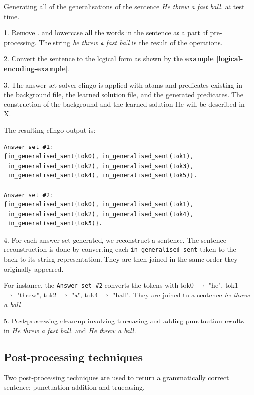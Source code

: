 \begin{example}
Generating all of the generalisations of the sentence \emph{He threw a fast ball.} at test time.

1. Remove . and lowercase all the words in the sentence as a part of pre-processing. The string \emph{he threw a fast ball} is the result of the operations.

2. Convert the sentence to the logical form as shown by the \textbf{example \ref{logical-encoding-example}}.

3. The answer set solver clingo is applied with atoms and predicates existing in the background file, the learned solution file, and the generated predicates.
The construction of the background and the learned solution file will be described in X.

The resulting clingo output is:
\begin{verbatim}
Answer set #1:
{in_generalised_sent(tok0), in_generalised_sent(tok1), 
 in_generalised_sent(tok2), in_generalised_sent(tok3), 
 in_generalised_sent(tok4), in_generalised_sent(tok5)}.
    
Answer set #2:
{in_generalised_sent(tok0), in_generalised_sent(tok1), 
 in_generalised_sent(tok2), in_generalised_sent(tok4), 
 in_generalised_sent(tok5)}.
\end{verbatim}

4. For each answer set generated, we reconstruct a sentence. 
The sentence reconstruction is done by converting each \verb+in_generalised_sent+ token to the back to its string representation.
They are then joined in the same order they originally appeared.

For instance, the \verb_Answer set #2_ converts the tokens with tok0 $\rightarrow$ "he", tok1 $\rightarrow$ "threw", tok2 $\rightarrow$ "a", tok4 $\rightarrow$ "ball".
They are joined to a sentence \textit{he threw a ball}

5. Post-processing clean-up involving truecasing and adding punctuation results in \emph{He threw a fast ball.} and \emph{He threw a ball.} \\
\end{example}
 
\subsection{Post-processing techniques}
\label{post-processing-techniques}

Two post-processing techniques are used to return a grammatically correct sentence: punctuation addition and truecasing.

